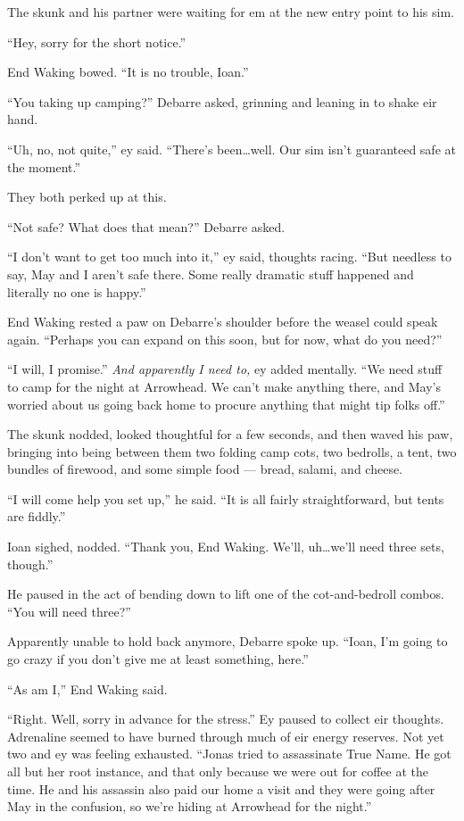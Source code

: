 The skunk and his partner were waiting for em at the new entry point to his sim.

``Hey, sorry for the short notice.''

End Waking bowed. ``It is no trouble, Ioan.''

``You taking up camping?'' Debarre asked, grinning and leaning in to shake eir hand.

``Uh, no, not quite,'' ey said. ``There's been\ldots well. Our sim isn't guaranteed safe at the moment.''

They both perked up at this.

``Not safe? What does that mean?'' Debarre asked.

``I don't want to get too much into it,'' ey said, thoughts racing. ``But needless to say, May and I aren't safe there. Some really dramatic stuff happened and literally no one is happy.''

End Waking rested a paw on Debarre's shoulder before the weasel could speak again. ``Perhaps you can expand on this soon, but for now, what do you need?''

``I will, I promise.'' \emph{And apparently I need to,} ey added mentally. ``We need stuff to camp for the night at Arrowhead. We can't make anything there, and May's worried about us going back home to procure anything that might tip folks off.''

The skunk nodded, looked thoughtful for a few seconds, and then waved his paw, bringing into being between them two folding camp cots, two bedrolls, a tent, two bundles of firewood, and some simple food — bread, salami, and cheese.

``I will come help you set up,'' he said. ``It is all fairly straightforward, but tents are fiddly.''

Ioan sighed, nodded. ``Thank you, End Waking. We'll, uh\ldots we'll need three sets, though.''

He paused in the act of bending down to lift one of the cot-and-bedroll combos. ``You will need three?''

Apparently unable to hold back anymore, Debarre spoke up. ``Ioan, I'm going to go crazy if you don't give me at least something, here.''

``As am I,'' End Waking said.

``Right. Well, sorry in advance for the stress.'' Ey paused to collect eir thoughts. Adrenaline seemed to have burned through much of eir energy reserves. Not yet two and ey was feeling exhausted. ``Jonas tried to assassinate True Name. He got all but her root instance, and that only because we were out for coffee at the time. He and his assassin also paid our home a visit and they were going after May in the confusion, so we're hiding at Arrowhead for the night.''

